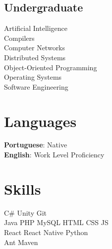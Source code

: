 \documentclass[a4paper]{deedy-resume} %
\begin{document}
\begin{minipage}[t]{0.33\textwidth}
\subsection{Undergraduate}

Artificial Intelligence\\
Compilers\\
Computer Networks\\
Distributed Systems\\
Object-Oriented Programming\\
Operating Systems\\
Software Engineering\\
\sectionspace %



\section{Languages} 
\textbf{Portuguese}: Native\\
\textbf{English}: Work Level Proficiency\\

\sectionspace %


\section{Skills}


C\# \textbullet{} Unity \textbullet{} Git\\

Java \textbullet{} PHP \textbullet{} MySQL \textbullet{} HTML \textbullet{} CSS \textbullet{} JS\\

React \textbullet{} React Native \textbullet{} Python\\
Ant \textbullet{} Maven\\


\sectionspace %

\end{minipage} %
\end{document}
